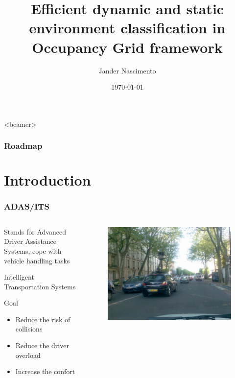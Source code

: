 \documentclass{beamer}
\title[Fast classification]{Efficient dynamic and static environment classification in Occupancy Grid framework}
\author{Jander Nascimento}
\institute{Université Joseph Fourier / INRIA}
\date{\today}
\begin{document}
\begin{frame}
\titlepage
\end{frame}

{
  \begin{frame}<beamer>
    \frametitle{Roadmap}
    \tableofcontents%
  \end{frame}
}

	\section{Introduction}
	
	\begin{frame}
		\frametitle{ADAS/ITS}
		
		\begin{columns}[t]
		  \begin{column}{5cm}
			\begin{exampleblock}{Stands for}	
				Advanced Driver Assistance Systems, cope with vehicle handling tasks
				
				Intelligent Transportation Systems
			\end{exampleblock}		
			\begin{block}{Goal}
				\begin{itemize}
				\item Reduce the risk of collisions
				\item Reduce the driver overload
				\item Increase the confort
				\end{itemize}
			\end{block}
		  \end{column}
		  
		  \begin{column}{5cm}
		  \begin{figure}[h]
			\center
			\includegraphics[scale=0.15]{img/fig:street:urban}
		  \end{figure}   
		  \end{column}
		 \end{columns}

	\end{frame}	
\end{document}
